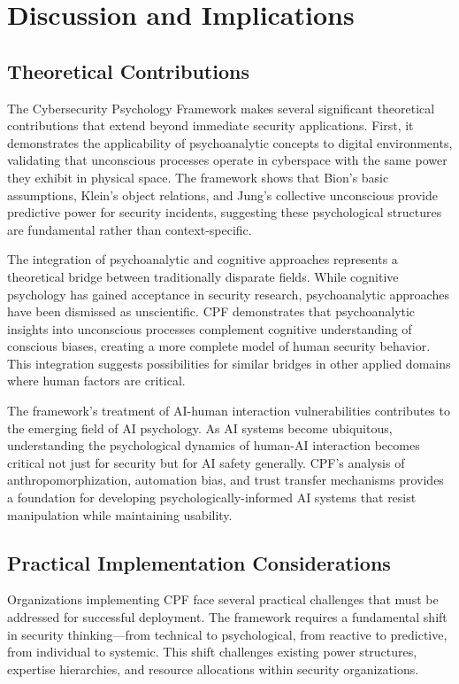 \documentclass[11pt,a4paper]{article}
\begin{document}
\section{Discussion and Implications}

\subsection{Theoretical Contributions}

The Cybersecurity Psychology Framework makes several significant theoretical contributions that extend beyond immediate security applications. First, it demonstrates the applicability of psychoanalytic concepts to digital environments, validating that unconscious processes operate in cyberspace with the same power they exhibit in physical space. The framework shows that Bion's basic assumptions, Klein's object relations, and Jung's collective unconscious provide predictive power for security incidents, suggesting these psychological structures are fundamental rather than context-specific.

The integration of psychoanalytic and cognitive approaches represents a theoretical bridge between traditionally disparate fields. While cognitive psychology has gained acceptance in security research, psychoanalytic approaches have been dismissed as unscientific. CPF demonstrates that psychoanalytic insights into unconscious processes complement cognitive understanding of conscious biases, creating a more complete model of human security behavior. This integration suggests possibilities for similar bridges in other applied domains where human factors are critical.

The framework's treatment of AI-human interaction vulnerabilities contributes to the emerging field of AI psychology. As AI systems become ubiquitous, understanding the psychological dynamics of human-AI interaction becomes critical not just for security but for AI safety generally. CPF's analysis of anthropomorphization, automation bias, and trust transfer mechanisms provides a foundation for developing psychologically-informed AI systems that resist manipulation while maintaining usability.

\subsection{Practical Implementation Considerations}

Organizations implementing CPF face several practical challenges that must be addressed for successful deployment. The framework requires a fundamental shift in security thinking—from technical to psychological, from reactive to predictive, from individual to systemic. This shift challenges existing power structures, expertise hierarchies, and resource allocations within security organizations.
\end{document}
